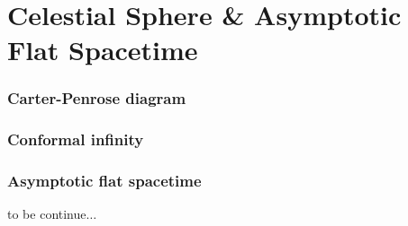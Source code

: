 \part{Celestial Sphere \&  Asymptotic Flat Spacetime}
\section{Carter-Penrose diagram}
\section{Conformal infinity}
\section{Asymptotic flat spacetime}
to be continue$\ldots$